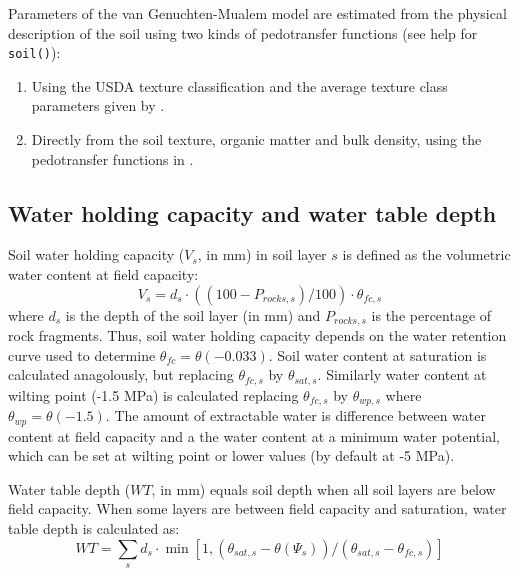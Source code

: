 \documentclass[]{book}
\providecommand{\tightlist}{%
  \setlength{\itemsep}{0pt}\setlength{\parskip}{0pt}}
\begin{document}
Parameters of the van Genuchten-Mualem model are estimated from the physical description of the soil using two kinds of pedotransfer functions (see help for \texttt{soil()}):

\begin{enumerate}
\def\labelenumi{\arabic{enumi}.}
\tightlist
\item
  Using the USDA texture classification and the average texture class parameters given by \citet{Carsel1988}.
\item
  Directly from the soil texture, organic matter and bulk density, using the pedotransfer functions in \citet{Toth2015}.
\end{enumerate}

\hypertarget{water-holding-capacity-and-water-table-depth}{%
\subsection{Water holding capacity and water table depth}\label{water-holding-capacity-and-water-table-depth}}

Soil water holding capacity (\(V_s\), in mm) in soil layer \(s\) is defined as the volumetric water content at field capacity:
\begin{equation}
V_s = d_s\cdot ((100-P_{rocks,s})/100)\cdot\theta_{fc,s}
\end{equation}
where \(d_s\) is the depth of the soil layer (in mm) and \(P_{rocks,s}\) is the percentage of rock fragments. Thus, soil water holding capacity depends on the water retention curve used to determine \(\theta_{fc} = \theta(-0.033)\). Soil water content at saturation is calculated anagolously, but replacing \(\theta_{fc,s}\) by \(\theta_{sat,s}\). Similarly water content at wilting point (-1.5 MPa) is calculated replacing \(\theta_{fc,s}\) by \(\theta_{wp,s}\) where \(\theta_{wp} = \theta(-1.5)\). The amount of extractable water is difference between water content at field capacity and a the water content at a minimum water potential, which can be set at wilting point or lower values (by default at -5 MPa).

Water table depth (\(WT\), in mm) equals soil depth when all soil layers are below field capacity. When some layers are between field capacity and saturation, water table depth is calculated as:
\begin{equation}
WT = \sum_{s}{d_s \cdot \min\left[1,(\theta_{sat,s} - \theta(\Psi_s))/(\theta_{sat,s}-\theta_{fc,s})\right]}
\end{equation}
\end{document}
